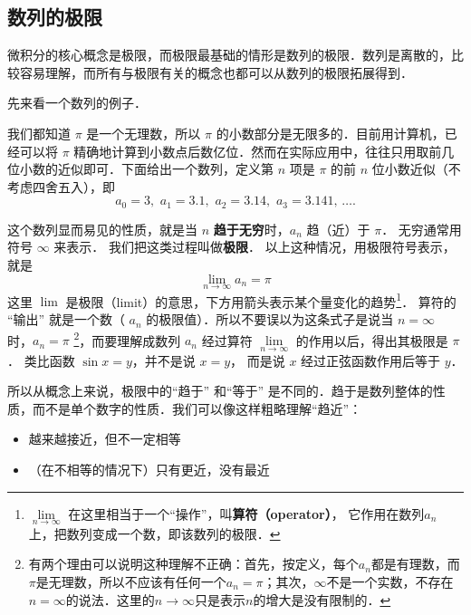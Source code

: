 
\subsection{数列的极限}

微积分的核心概念是极限，而极限最基础的情形是数列的极限．数列是离散的，比较容易理解，而所有与极限有关的概念也都可以从数列的极限拓展得到．

先来看一个数列的例子．

\begin{example}{}\label{Lim0_ex1}
我们都知道 $\pi$ 是一个无理数，所以 $\pi$ 的小数部分是无限多的．目前用计算机，已经可以将 $\pi$ 精确地计算到小数点后数亿位．然而在实际应用中，往往只用取前几位小数的近似即可．下面给出一个数列，定义第 $n$ 项是 $\pi$ 的前 $n$ 位小数近似（不考虑四舍五入），即
\begin{equation}
a_0 = 3,\,\, a_1 = 3.1,\,\, a_2 = 3.14,\,\, a_3 = 3.141,\,\dots.
\end{equation}
\end{example}

这个数列显而易见的性质，就是当 $n$ \textbf{趋于无穷}时，$a_n$ 趋（近）于 $\pi$． 无穷通常用符号 $\infty$ 来表示． 我们把这类过程叫做\textbf{极限}． 以上这种情况，用极限符号表示，就是
\begin{equation}
\lim_{n \to \infty } {a_n} = \pi 
\end{equation}
这里 $\lim$ 是极限（limit）的意思，下方用箭头表示某个量变化的趋势\footnote{$\lim\limits_{n \to \infty }$ 在这里相当于一个“操作”，叫\textbf{算符（operator）}， 它作用在数列$a_n$ 上，把数列变成一个数，即该数列的极限．}． 算符的 “输出” 就是一个数（ $a_n$ 的极限值）．所以不要误以为这条式子是说当 $n = \infty$ 时，$a_n=\pi$ \footnote{有两个理由可以说明这种理解不正确：首先，按定义，每个$a_n$都是有理数，而$\pi$是无理数，所以不应该有任何一个$a_n=\pi$；其次，$\infty$不是一个实数，不存在$n=\infty$的说法．这里的$n\to\infty$只是表示$n$的增大是没有限制的．}，而要理解成数列 $a_n$ 经过算符 $\lim\limits_{n \to \infty }$ 的作用以后，得出其极限是 $\pi$． 类比函数 $\sin x = y$，并不是说 $x=y$， 而是说 $x$ 经过正弦函数作用后等于 $y$． 

所以从概念上来说，极限中的“趋于” 和“等于” 是不同的．趋于是数列整体的性质，而不是单个数字的性质．我们可以像这样粗略理解“趋近”：
\begin{itemize}
\item 越来越接近，但不一定相等
\item （在不相等的情况下）只有更近，没有最近
\end{itemize}

